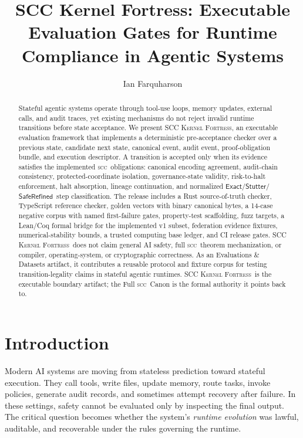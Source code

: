 \documentclass{article}
\title{SCC Kernel Fortress: Executable Evaluation Gates for Runtime Compliance in Agentic Systems}
\author{Ian Farquharson}
\newcommand{\SCC}{\textsc{scc}}
\newcommand{\KF}{\textsc{SCC Kernel Fortress}}
\newcommand{\Exact}{\ensuremath{\mathsf{Exact}}}
\newcommand{\Stutter}{\ensuremath{\mathsf{Stutter}}}
\newcommand{\SafeRefined}{\ensuremath{\mathsf{SafeRefined}}}
\begin{document}
\maketitle

\begin{abstract}
Stateful agentic systems operate through tool-use loops, memory updates, external calls, and audit traces, yet existing mechanisms do not reject invalid runtime transitions before state acceptance. We present \KF, an executable evaluation framework that implements a deterministic pre-acceptance checker over a previous state, candidate next state, canonical event, audit event, proof-obligation bundle, and execution descriptor. A transition is accepted only when its evidence satisfies the implemented \SCC\ obligations: canonical encoding agreement, audit-chain consistency, protected-coordinate isolation, governance-state validity, risk-to-halt enforcement, halt absorption, lineage continuation, and normalized \Exact/\Stutter/\SafeRefined\ step classification. The release includes a Rust source-of-truth checker, TypeScript reference checker, golden vectors with binary canonical bytes, a 14-case negative corpus with named first-failure gates, property-test scaffolding, fuzz targets, a Lean/Coq formal bridge for the implemented v1 subset, federation evidence fixtures, numerical-stability bounds, a trusted computing base ledger, and CI release gates. \KF\ does not claim general AI safety, full \SCC\ theorem mechanization, or compiler, operating-system, or cryptographic correctness. As an Evaluations \& Datasets artifact, it contributes a reusable protocol and fixture corpus for testing transition-legality claims in stateful agentic runtimes. \KF\ is the executable boundary artifact; the Full \SCC\ Canon is the formal authority it points back to.
\end{abstract}

\section{Introduction}
Modern AI systems are moving from stateless prediction toward stateful execution. They call tools, write files, update memory, route tasks, invoke policies, generate audit records, and sometimes attempt recovery after failure. In these settings, safety cannot be evaluated only by inspecting the final output. The critical question becomes whether the system's \emph{runtime evolution} was lawful, auditable, and recoverable under the rules governing the runtime.
\end{document}
